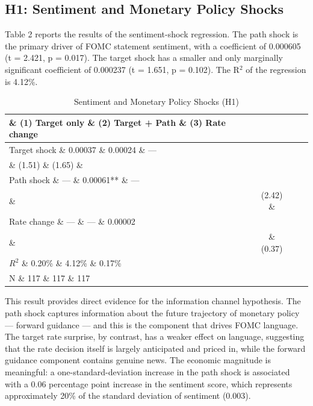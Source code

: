 \documentclass[12pt]{article}
\begin{document}
\subsection{H1: Sentiment and Monetary Policy Shocks}

Table 2 reports the results of the sentiment-shock regression. The path shock is the primary driver of FOMC statement sentiment, with a coefficient of 0.000605 (t = 2.421, p = 0.017). The target shock has a smaller and only marginally significant coefficient of 0.000237 (t = 1.651, p = 0.102). The R$^2$ of the regression is 4.12\%.


\begin{table}[htbp]\centering\caption{Sentiment and Monetary Policy Shocks (H1)}\label{tab:h1}
\begin{tabular}{lccc}\toprule
 \& (1) Target only \& (2) Target + Path \& (3) Rate change \\\midrule
Target shock \& 0.00037 \& 0.00024 \& --- \\
 \& (1.51) \& (1.65) \& \\
Path shock \& --- \& 0.00061** \& --- \\
 \& & (2.42) \& \\
Rate change \& --- \& --- \& 0.00002 \\
 \& & \& (0.37) \\\midrule
$R^2$ \& 0.20\% \& 4.12\% \& 0.17\% \\
N \& 117 \& 117 \& 117 \\\bottomrule\end{tabular}
\par\vspace{2pt}{\footnotesize Newey-West HAC standard errors with lag=4. t-statistics in parentheses. ** $p < 0.05$, * $p < 0.10$.}\end{table}


This result provides direct evidence for the information channel hypothesis. The path shock captures information about the future trajectory of monetary policy --- forward guidance --- and this is the component that drives FOMC language. The target rate surprise, by contrast, has a weaker effect on language, suggesting that the rate decision itself is largely anticipated and priced in, while the forward guidance component contains genuine news. The economic magnitude is meaningful: a one-standard-deviation increase in the path shock is associated with a 0.06 percentage point increase in the sentiment score, which represents approximately 20\% of the standard deviation of sentiment (0.003).
\end{document}
